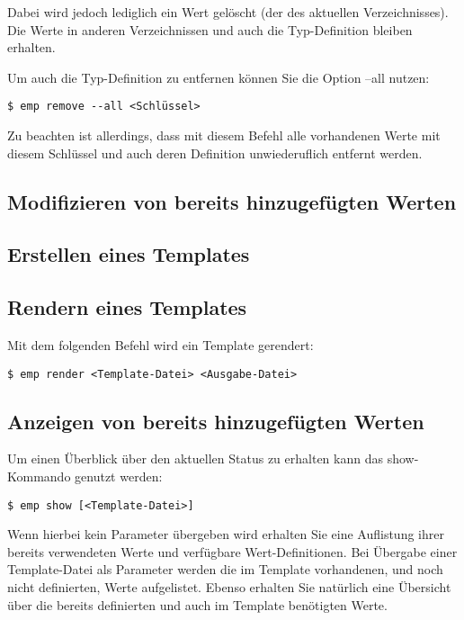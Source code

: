 Dabei wird jedoch lediglich ein Wert gelöscht (der des aktuellen Verzeichnisses). Die Werte in anderen Verzeichnissen und auch die Typ-Definition bleiben erhalten.

Um auch die Typ-Definition zu entfernen können Sie die Option --all nutzen:
\begin{lstlisting}[style=Bash]
$ emp remove --all <Schlüssel>
\end{lstlisting}
Zu beachten ist allerdings, dass mit diesem Befehl alle vorhandenen Werte mit diesem Schlüssel und auch deren Definition unwiederuflich entfernt werden.

\subsection{Modifizieren von bereits hinzugefügten Werten}
\subsection{Erstellen eines Templates}
\subsection{Rendern eines Templates}
Mit dem folgenden Befehl wird ein Template gerendert:
\begin{lstlisting}[style=Bash]
$ emp render <Template-Datei> <Ausgabe-Datei>
\end{lstlisting}

\subsection{Anzeigen von bereits hinzugefügten Werten}
Um einen Überblick über den aktuellen Status zu erhalten kann das show-Kommando genutzt werden:
\begin{lstlisting}[style=Bash]
$ emp show [<Template-Datei>]
\end{lstlisting}
Wenn hierbei kein Parameter übergeben wird erhalten Sie eine Auflistung ihrer bereits verwendeten Werte und verfügbare Wert-Definitionen.
Bei Übergabe einer Template-Datei als Parameter werden die im Template vorhandenen, und noch nicht definierten, Werte aufgelistet. Ebenso erhalten Sie natürlich eine Übersicht über die bereits definierten und auch im Template benötigten Werte.
